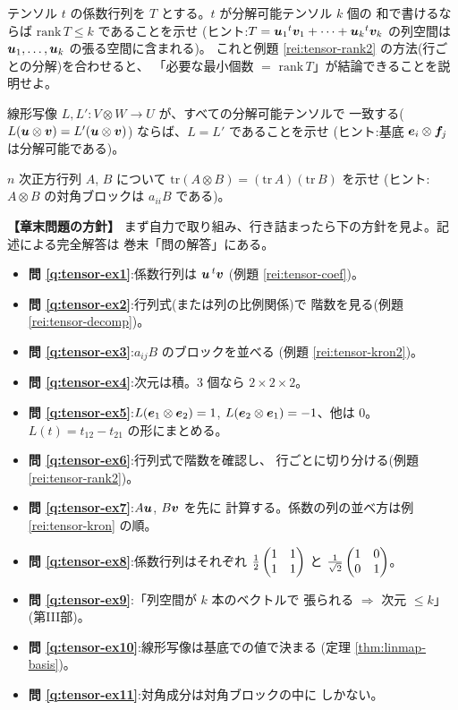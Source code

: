 \begin{mondai}[発展]\label{q:tensor-ex9}
テンソル $t$ の係数行列を $T$ とする。$t$ が分解可能テンソル $k$ 個の
和で書けるならば $\mathrm{rank}\,T \le k$ であることを示せ
(ヒント:$T = \bm{u}_1{}^t\bm{v}_1 + \cdots + \bm{u}_k{}^t\bm{v}_k$
の列空間は $\bm{u}_1, \dots, \bm{u}_k$ の張る空間に含まれる)。
これと例題 \ref{rei:tensor-rank2} の方法(行ごとの分解)を合わせると、
「必要な最小個数 $=$ $\mathrm{rank}\,T$」が結論できることを説明せよ。
\end{mondai}

\begin{mondai}[証明]\label{q:tensor-ex10}
線形写像 $L, L' : V \otimes W \to U$ が、すべての分解可能テンソルで
一致する($L(\bm{u} \otimes \bm{v}) = L'(\bm{u} \otimes \bm{v})$)
ならば、$L = L'$ であることを示せ
(ヒント:基底 $\bm{e}_i \otimes \bm{f}_j$ は分解可能である)。
\end{mondai}

\begin{mondai}[証明]\label{q:tensor-ex11}
$n$ 次正方行列 $A$, $B$ について
$\mathrm{tr}(A \otimes B) = (\mathrm{tr}\,A)(\mathrm{tr}\,B)$ を示せ
(ヒント:$A \otimes B$ の対角ブロックは $a_{ii}B$ である)。
\end{mondai}

\bigskip
{\small
\noindent\textbf{【章末問題の方針】}\quad
まず自力で取り組み、行き詰まったら下の方針を見よ。記述による完全解答は
巻末「問の解答」にある。
\begin{itemize}
\item \textbf{問 \ref{q:tensor-ex1}}:係数行列は $\bm{u}\,{}^t\bm{v}$
(例題 \ref{rei:tensor-coef})。
\item \textbf{問 \ref{q:tensor-ex2}}:行列式(または列の比例関係)で
階数を見る(例題 \ref{rei:tensor-decomp})。
\item \textbf{問 \ref{q:tensor-ex3}}:$a_{ij}B$ のブロックを並べる
(例題 \ref{rei:tensor-kron2})。
\item \textbf{問 \ref{q:tensor-ex4}}:次元は積。$3$ 個なら
$2 \times 2 \times 2$。
\item \textbf{問 \ref{q:tensor-ex5}}:$L(\bm{e}_1 \otimes \bm{e}_2) = 1$,
$L(\bm{e}_2 \otimes \bm{e}_1) = -1$、他は $0$。
$L(t) = t_{12} - t_{21}$ の形にまとめる。
\item \textbf{問 \ref{q:tensor-ex6}}:行列式で階数を確認し、
行ごとに切り分ける(例題 \ref{rei:tensor-rank2})。
\item \textbf{問 \ref{q:tensor-ex7}}:$A\bm{u}$, $B\bm{v}$ を先に
計算する。係数の列の並べ方は例 \ref{rei:tensor-kron} の順。
\item \textbf{問 \ref{q:tensor-ex8}}:係数行列はそれぞれ
$\frac{1}{2}\begin{pmatrix}1 & 1 \\ 1 & 1\end{pmatrix}$ と
$\frac{1}{\sqrt{2}}\begin{pmatrix}1 & 0 \\ 0 & 1\end{pmatrix}$。
\item \textbf{問 \ref{q:tensor-ex9}}:「列空間が $k$ 本のベクトルで
張られる $\Rightarrow$ 次元 $\le k$」(第III部)。
\item \textbf{問 \ref{q:tensor-ex10}}:線形写像は基底での値で決まる
(定理 \ref{thm:linmap-basis})。
\item \textbf{問 \ref{q:tensor-ex11}}:対角成分は対角ブロックの中に
しかない。
\end{itemize}
}

